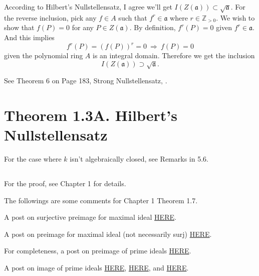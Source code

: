 According to Hilbert's Nullstellensatz, I agree we'll get $I(Z(\mathfrak a))\subset \sqrt{\mathfrak a}$.
For the reverse inclusion, pick any $f\in A$ such that $f^r\in\mathfrak a$ where $r\in\mathbb Z_{>0}$. We wish to show that $f(P)=0$ for any $P\in Z(\mathfrak a)$. By definition, $f^r(P)=0$ given $f^r\in\mathfrak a$. And this implies $$f^r(P)=(f(P))^r=0 ~\Rightarrow~ f(P)=0$$ given the polynomial ring $A$ is an integral domain. Therefore we get the inclusion 
$$I(Z(\mathfrak a))\supset \sqrt{\mathfrak a}.$$

See Theorem 6 on Page 183, Strong Nullstellensatz, \cite{cox2013ideals}. 

\section{Theorem 1.3A. Hilbert's Nullstellensatz}

For the case where $k$ isn't algebraically closed, see \cite{reid1995undergraduate} Remarks in 5.6.

\subsection{}

For the proof, see \cite{kemper2011course} Chapter 1 for details.

The followings are some comments for \cite{kemper2011course} Chapter 1 Theorem 1.7.

A post on surjective preimage for maximal ideal \href{https://math.stackexchange.com/questions/1198414/pull-back-image-of-maximal-ideal-under-surjective-ring-homomorphism-is-maximal}{HERE}.

A post on preimage for maximal ideal (not necessarily surj) \href{https://math.stackexchange.com/questions/882524/in-an-extension-of-finitely-generated-k-algebras-the-contraction-of-a-maximal}{HERE}.

For completeness, a post on preimage of prime ideals \href{https://math.stackexchange.com/questions/409999/prove-that-the-preimage-of-a-prime-ideal-is-also-prime}{HERE}.

A post on image of prime ideals \href{https://math.stackexchange.com/questions/1805457/how-to-prove-that-the-image-of-a-prime-ideal-is-also-a-prime-ideal}{HERE}, \href{https://math.stackexchange.com/questions/292829/a-proof-that-shows-surjective-homomorphic-image-of-prime-ideal-is-prime}{HERE}, and \href{https://math.stackexchange.com/questions/1144695/assume-p-is-a-prime-ideal-s-t-k-subset-p-show-fp-is-a-prime-ideal}{HERE}.

